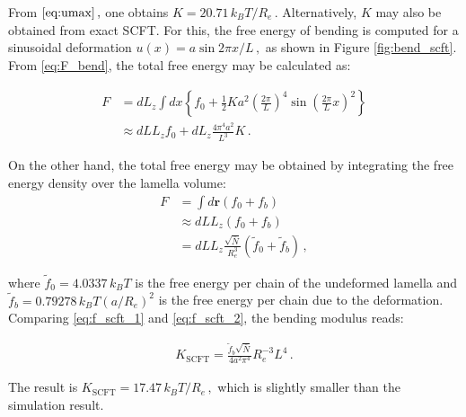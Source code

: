 \documentclass[bachelor,       %
               twoside,        %
               BCOR10mm,       %
               ngerman, english %
               ]{GAUBM}
\begin{document}
From $\eqref{eq:umax}\,,$ one obtains $K=20.71\,k_BT/R_e\,.$ Alternatively, $K$ may also be obtained from exact \ac{SCFT}. For this, the free energy of bending is computed for a sinusoidal deformation $u(x)=a\sin2\pi x/L\,,$ as shown in Figure \ref{fig:bend_scft}. From \eqref{eq:F_bend}, the total free energy may be calculated as:

\begin{align}
    F&=dL_z\int dx\left\{f_0+\frac{1}{2}Ka^2\left(\frac{2\pi}{L}\right)^4\sin\left(\frac{2\pi}{L}x\right)^2\right\}\nonumber\\
    &\approx dLL_zf_0+dL_z\frac{4\pi^4a^2}{L^3}K\,.
    \label{eq:f_scft_1}
\end{align}

On the other hand, the total free energy may be obtained by integrating the free energy density over the lamella volume:
\begin{align}
    F&=\int d\mathbf r(f_0+f_b)\nonumber\\
    &\approx dLL_z(f_0+f_b)\nonumber \\
    &=dLL_z\frac{\sqrt{\bar N}}{R_e^3}(\tilde f_0+\tilde f_b)\,,
    \label{eq:f_scft_2}
\end{align}

where $\tilde f_0=4.0337\,k_BT$ is the free energy per chain of the undeformed lamella and $\tilde f_b=0.79278\,k_BT(a/R_e)^2$ is the free energy per chain due to the deformation. Comparing \eqref{eq:f_scft_1} and \eqref{eq:f_scft_2}, the bending modulus reads:

\begin{align}
    K_\text{SCFT}=\frac{\tilde f_b\sqrt{\bar N}}{4a^2\pi^4}R_e^{-3}L^4\,.
\end{align}

The result is $K_\text{SCFT}=17.47\,k_BT/R_e\,,$ which is slightly smaller than the simulation result. 




\end{document}
